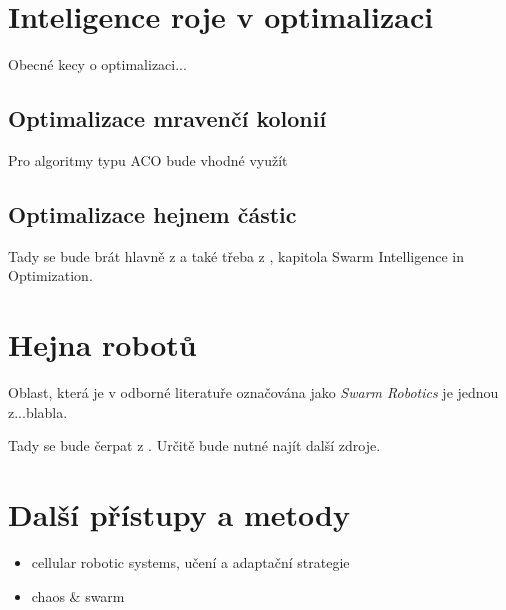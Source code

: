 \documentclass[a4paper,12pt]{article}
\let\stdsection\section
\renewcommand\section{\newpage\stdsection}
\begin{document}
\section{Inteligence roje v optimalizaci}
Obecné kecy o optimalizaci...

\subsection{Optimalizace mravenčí kolonií}
Pro algoritmy typu ACO bude vhodné využít \cite{Dorigo06antcolony}

\subsection{Optimalizace hejnem částic}
Tady se bude brát hlavně z \cite{Blum08SwarmOpt} a také třeba
z \cite{Blum08SwarmInt}, kapitola Swarm Intelligence in Optimization.



\section{Hejna robotů}
Oblast, která je v odborné literatuře označována jako {\it Swarm Robotics} je jednou z...blabla.

Tady se bude čerpat z \cite{Dudek93}. Určitě bude nutné najít další zdroje.



\section{Další přístupy a metody}
\begin{itemize}
  \item cellular robotic systems, učení a adaptační strategie
  \item chaos \& swarm
\end{itemize}



\renewcommand{\refname}{\section{Použitá literatura}}


\end{document}
